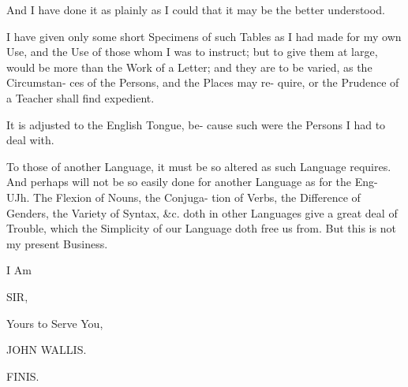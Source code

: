 And I have done it as plainly as I could
that it may be the better understood.

I have given only some short Specimens
of such Tables as I had made for my own
Use, and the Use of those whom I was to
instruct; but to give them at large, would
be more than the Work of a Letter; and
they are to be varied, as the Circumstan-
ces of the Persons, and the Places may re-
quire, or the Prudence of a Teacher shall
find expedient.

It is adjusted to the English Tongue, be-
cause such were the Persons I had to deal
with.

To those of another Language, it must
be so altered as such Language requires.
And perhaps will not be so easily done
for another Language as for the Eng-
UJh. The Flexion of Nouns, the Conjuga-
tion of Verbs, the Difference of Genders,
the Variety of Syntax, &c. doth in other
Languages give a great deal of Trouble,
which the Simplicity of our Language
doth free us from. But this is not my
present Business.

I Am

SIR,

Yours to Serve You,

JOHN WALLIS.


FINIS.
